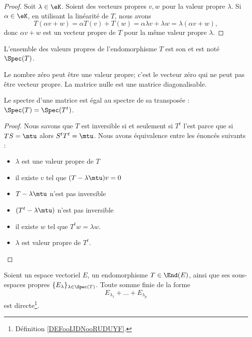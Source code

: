 \begin{proof}
	Soit \( \lambda\in \eK\). Soient des vecteurs propres \( v,w\) pour la valeur propre \( \lambda\). Si \( \alpha\in \eK\), en utilisant la linéarité de \( T\), nous avons
	\begin{equation}
		T(\alpha v+w)=\alpha T(v)+T(w)=\alpha\lambda v+\lambda w=\lambda(\alpha v+w),
	\end{equation}
	donc \( \alpha v+w\) est un vecteur propre de \( T\) pour la même valeur propre \( \lambda\).
\end{proof}

\begin{definition}
	L'ensemble des valeurs propres de l'endomorphisme \( T\) est son  et est noté \( \Spec(T)\).
\end{definition}

\begin{remark}
	Le nombre zéro peut être une valeur propre; c'est le vecteur zéro qui ne peut pas être vecteur propre. La matrice nulle est une matrice diagonalisable.
\end{remark}

\begin{lemma}     \label{LEMooWHWUooFFXlzT}
	Le spectre d'une matrice est égal au spectre de sa transposée : \( \Spec(T)=\Spec(T^t)\).
\end{lemma}

\begin{proof}
	Nous savons que \( T\) est inversible si et seulement si \( T^t\) l'est parce que si \( TS=\mtu\) alors \( S^tT^t=\mtu\). Nous avons équivalence entre les énoncés suivants :
	\begin{itemize}
		\item \( \lambda\) est une valeur propre de \( T\)
		\item
		      il existe \( v\) tel que \( (T-\lambda\mtu)v=0\)
		\item
		      \( T-\lambda\mtu\) n'est pas inversible
		\item
		      \( (T^t-\lambda\mtu)\) n'est pas inversible
		\item
		      il existe \( w\) tel que \( T^tw=\lambda w\).
		\item
		      \( \lambda\) est valeur propre de \( T^t\).
	\end{itemize}
\end{proof}

\begin{lemma}       \label{LemjcztYH}
	Soient un espace vectoriel \( E\), un endomorphisme \( T\in \End(E)\), ainsi que ses sous-espaces propres \( \{ E_{\lambda} \}_{\lambda\in \Spec(T)}  \). Toute somme finie de la forme
	\begin{equation}
		E_{\lambda_1}+\ldots+E_{\lambda_p}
	\end{equation}
	est directe\footnote{Définition \ref{DEFooIJDNooRUDUYF}.}.
\end{lemma}

